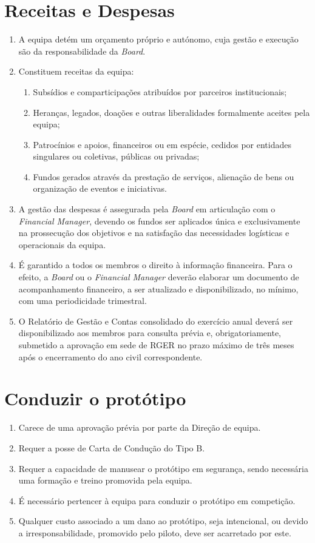 \section{Receitas e Despesas}
\begin{enumerate}
  \item A equipa detém um orçamento próprio e autónomo, cuja gestão e execução são da responsabilidade da \textit{Board}.
  \item Constituem receitas da equipa:
  \begin{enumerate}
    \item Subsídios e comparticipações atribuídos por parceiros institucionais;
    \item Heranças, legados, doações e outras liberalidades formalmente aceites pela equipa;
    \item Patrocínios e apoios, financeiros ou em espécie, cedidos por entidades singulares ou coletivas, públicas ou privadas;
    \item Fundos gerados através da prestação de serviços, alienação de bens ou organização de eventos e iniciativas.
  \end{enumerate}
  \item A gestão das despesas é assegurada pela \textit{Board} em articulação com o \textit{Financial Manager}, devendo os fundos ser aplicados única e exclusivamente na prossecução dos objetivos e na satisfação das necessidades logísticas e operacionais da equipa.
  \item É garantido a todos os membros o direito à informação financeira. Para o efeito, a \textit{Board} ou o \textit{Financial Manager} deverão elaborar um documento de acompanhamento financeiro, a ser atualizado e disponibilizado, no mínimo, com uma periodicidade trimestral.
  \item O Relatório de Gestão e Contas consolidado do exercício anual deverá ser disponibilizado aos membros para consulta prévia e, obrigatoriamente, submetido a aprovação em sede de RGER no prazo máximo de três meses após o encerramento do ano civil correspondente.
\end{enumerate}

\section{Conduzir o protótipo}
\begin{enumerate}
  \item Carece de uma aprovação prévia por parte da Direção de equipa.
  \item Requer a posse de Carta de Condução do Tipo B.
  \item Requer a capacidade de manusear o protótipo em segurança, sendo necessária uma formação e treino promovida pela equipa.
  \item É necessário pertencer à equipa para conduzir o protótipo em competição.
  \item Qualquer custo associado a um dano ao protótipo, seja intencional, ou devido a irresponsabilidade, promovido pelo piloto, deve ser acarretado por este.
\end{enumerate}

